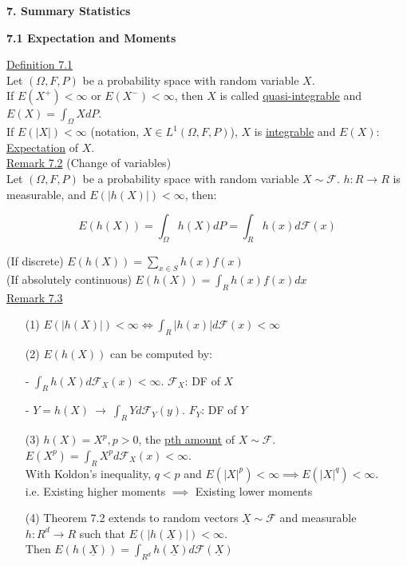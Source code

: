 \documentclass[10pt,letterpaper]{article}
\begin{document}
\pagebreak

\begin{center}
\textbf{7. Summary Statistics}
\end{center}

\textbf{7.1 Expectation and Moments}

\underline{Definition 7.1}\\

Let $(\Omega, F, P)$ be a probability space with random variable $X$.\\

If $E(X^+)<\infty$ or $E(X^-)<\infty$, then $X$ is called \underline{quasi-integrable} and $E(X)=\int_{\Omega}XdP$.\\

If $E(|X|)<\infty$ (notation, $X\in L^1(\Omega, F, P)$), $X$ is \underline{integrable} and $E(X)$: \underline{Expectation} of $X$.\\

\underline{Remark 7.2} (Change of variables)\\

Let $(\Omega, F, P)$ be a probability space with random variable $X\sim\mathcal{F}$. $h:R\rightarrow R$ is measurable, and $E(|h(X)|)<\infty$, then:

$$E(h(X))=\int_{\Omega}h(X)dP=\int_{R}h(x)d\mathcal{F}(x)$$

(If discrete) $E(h(X))=\sum_{x\in S}h(x)f(x)$\\

(If absolutely continuous) $E(h(X))=\int_{R}h(x)f(x)dx$\\

\underline{Remark 7.3}\\

\begin{enumerate}

\item[(1)] $E(|h(X)|)<\infty\iff\int_{R}|h(x)|d\mathcal{F}(x)<\infty$

\item[(2)] $E(h(X))$ can be computed by:
  \item[-] $\int_{R}h(X)d\mathcal{F}_X(x)<\infty$. $\mathcal{F}_X$: DF of $X$
  \item[-] $Y=h(X)~\rightarrow~\int_{R}Yd\mathcal{F}_Y(y)$. $F_Y$: DF of $Y$

\item[(3)] $h(X)=X^p, p>0$, the \underline{pth amount} of $X\sim\mathcal{F}$. $E(X^p)=\int_{R}X^pd\mathcal{F}_X(x)<\infty$.\\

With Koldon's inequality, $q<p$ and $E(|X|^p)<\infty\implies E(|X|^q)<\infty$.\\

i.e. Existing higher moments $\implies$ Existing lower moments

\item[(4)] Theorem 7.2 extends to random vectors $\underline{X}\sim\mathcal{F}$ and measurable $h:R^d\rightarrow R$ such that $E(|h(\underline{X})|)<\infty$.\\

Then $E(h(\underline{X}))=\int_{R^d}h(\underline{X})d\mathcal{F}(\underline{X})$

\end{enumerate}
\end{document}
